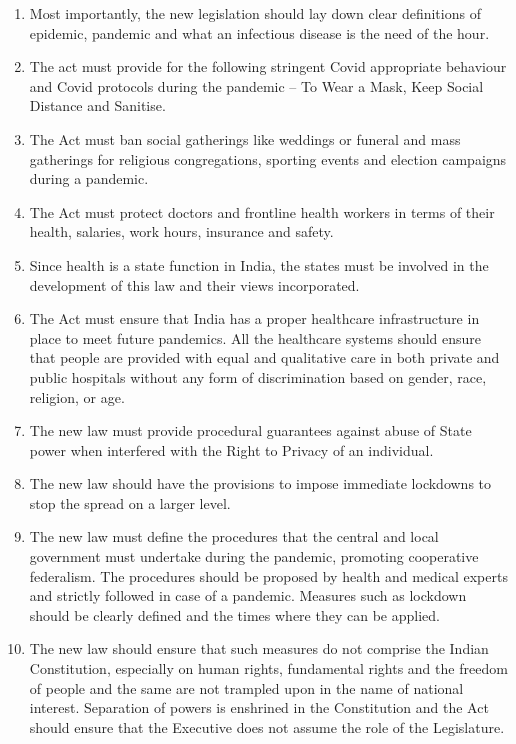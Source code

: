 \begin{multicols}{2}
\begin{enumerate}[label=$\bullet$]
\item Most importantly, the new legislation should lay down clear definitions of epidemic, pandemic and what an infectious disease is the need of the hour.

\item The act must provide for the following stringent Covid appropriate behaviour and Covid protocols during the pandemic – To Wear a Mask, Keep Social Distance and Sanitise.

\item The Act must ban social gatherings like weddings or funeral and mass gatherings for religious congregations, sporting events and election campaigns during a pandemic.

\item The Act must protect doctors and frontline health workers in terms of their health,
salaries, work hours, insurance and safety.

\item Since health is a state function in India, the states must be involved in the
development of this law and their views incorporated.

\item The Act must ensure that India has a proper healthcare infrastructure in place to meet
future pandemics. All the healthcare systems should ensure that people are provided
with equal and qualitative care in both private and public hospitals without any form
of discrimination based on gender, race, religion, or age.

\item The new law must provide procedural guarantees against abuse of State power when
interfered with the Right to Privacy of an individual.

\item The new law should have the provisions to impose immediate lockdowns to stop the
spread on a larger level.

\item The new law must define the procedures that the central and local government must
undertake during the pandemic, promoting cooperative federalism. The procedures
should be proposed by health and medical experts and strictly followed in case of a
pandemic. Measures such as lockdown should be clearly defined and the times where
they can be applied.

\item The new law should ensure that such measures do not comprise the Indian
Constitution, especially on human rights, fundamental rights and the freedom of
people and the same are not trampled upon in the name of national interest.
Separation of powers is enshrined in the Constitution and the Act should ensure that
the Executive does not assume the role of the Legislature.


\end{enumerate}
\end{multicols}
